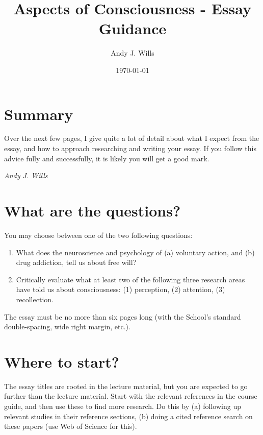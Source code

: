 \documentclass[11pt]{article}
\begin{document}
\title{Aspects of Consciousness - Essay Guidance}

\author{Andy J. Wills}
\date{\today}
\maketitle


\section*{Summary}
Over the next few pages, I give quite a lot of detail about what I expect from the essay, and how to approach researching and writing your essay. If you follow this advice fully and successfully, it is likely you will get a good mark.

\begin{flushright}
	\emph{Andy J. Wills}
\end{flushright}

\section*{What are the questions?}

You may choose between one of the two following questions:

\begin{enumerate}

\item What does the neuroscience and psychology of (a) voluntary action, and (b) drug addiction, tell us about free will?

\item Critically evaluate what at least two of the following three research areas have told us about consciousness: (1) perception, (2) attention, (3) recollection. 

\end{enumerate}

The essay must be no more than six pages long (with the School's standard double-spacing, wide right margin, etc.).


\section*{Where to start?}

The essay titles are rooted in the lecture material, but you are expected to go further than the lecture material. Start with the relevant references in the course guide, and then use these to find more research. Do this by (a) following up relevant studies in their reference sections, (b) doing a cited reference search on these papers (use Web of Science for this). 
\end{document}
